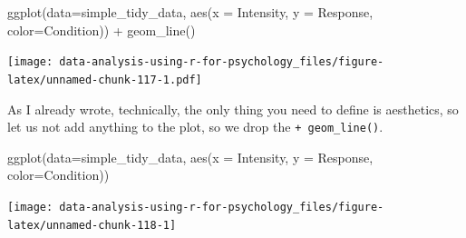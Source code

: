 \documentclass[
]{book}
\newenvironment{Shaded}{\begin{snugshade}}{\end{snugshade}}
\newcommand{\AttributeTok}[1]{\textcolor[rgb]{0.77,0.63,0.00}{#1}}
\newcommand{\FunctionTok}[1]{\textcolor[rgb]{0.00,0.00,0.00}{#1}}
\newcommand{\NormalTok}[1]{#1}
\newcommand{\SpecialCharTok}[1]{\textcolor[rgb]{0.00,0.00,0.00}{#1}}
\begin{document}
\begin{Shaded}
\begin{Highlighting}[]
\FunctionTok{ggplot}\NormalTok{(}\AttributeTok{data=}\NormalTok{simple\_tidy\_data, }\FunctionTok{aes}\NormalTok{(}\AttributeTok{x =}\NormalTok{ Intensity, }\AttributeTok{y =}\NormalTok{ Response, }\AttributeTok{color=}\NormalTok{Condition)) }\SpecialCharTok{+} 
  \FunctionTok{geom\_line}\NormalTok{()}
\end{Highlighting}
\end{Shaded}

\texttt{[image: data-analysis-using-r-for-psychology\_files/figure-latex/unnamed-chunk-117-1.pdf]}

As I already wrote, technically, the only thing you need to define is aesthetics, so let us not add anything to the plot, so we drop the \texttt{+\ geom\_line()}.

\begin{Shaded}
\begin{Highlighting}[]
\FunctionTok{ggplot}\NormalTok{(}\AttributeTok{data=}\NormalTok{simple\_tidy\_data, }\FunctionTok{aes}\NormalTok{(}\AttributeTok{x =}\NormalTok{ Intensity, }\AttributeTok{y =}\NormalTok{ Response, }\AttributeTok{color=}\NormalTok{Condition))}
\end{Highlighting}
\end{Shaded}

\begin{center}\texttt{[image: data-analysis-using-r-for-psychology\_files/figure-latex/unnamed-chunk-118-1]} \end{center}
\end{document}
